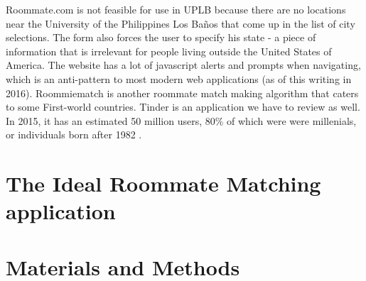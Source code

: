 \documentclass[journal]{./IEEE/IEEEtran}
\newcommand{\UPLB}{University of the Philippines Los Ba\~{n}os }
\begin{document}
Roommate.com is not feasible for use in UPLB because there are no locations near the \UPLB that come up in the list of city selections. The form also forces the user to specify his state - a piece of information that is irrelevant for people living outside the United States of America. The website has a lot of javascript alerts and prompts when navigating, which is an anti-pattern to most modern web applications (as of this writing in 2016).
Roommiematch is another roommate match making algorithm that caters to some First-world countries.
Tinder is an application we have to review as well. In 2015, it has an estimated 50 million users\cite{tinderstat2}, 80\% of which were were millenials, or individuals born after 1982 \cite{tinderstat}\cite{millenial}.

\section{The Ideal Roommate Matching application}

\section{Materials and Methods}



\newpage
\appendices
\end{document}
